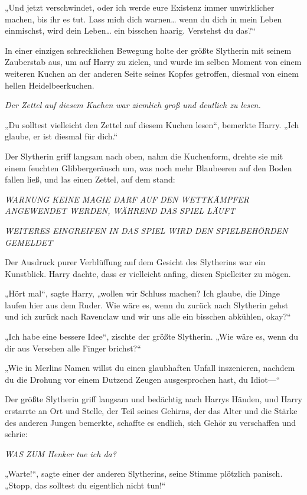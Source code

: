 {„Und jetzt verschwindet, oder ich werde eure Existenz immer unwirklicher machen, bis ihr es tut. Lass mich dich warnen… wenn du dich in mein Leben einmischst, wird dein Leben… ein bisschen haarig. Verstehst du das?“

In einer einzigen schrecklichen Bewegung holte der größte Slytherin mit seinem Zauberstab aus, um auf Harry zu zielen, und wurde im selben Moment von einem weiteren Kuchen an der anderen Seite seines Kopfes getroffen, diesmal von einem hellen Heidelbeerkuchen.

\emph{Der Zettel auf diesem Kuchen war ziemlich groß und deutlich zu lesen.}

„Du solltest vielleicht den Zettel auf diesem Kuchen lesen“, bemerkte Harry. „Ich glaube, er ist diesmal für dich.“

Der Slytherin griff langsam nach oben, nahm die Kuchenform, drehte sie mit einem feuchten Glibbergeräusch um, was noch mehr Blaubeeren auf den Boden fallen ließ, und las einen Zettel, auf dem stand:

\emph{WARNUNG KEINE MAGIE DARF AUF DEN WETTKÄMPFER ANGEWENDET WERDEN, WÄHREND DAS SPIEL LÄUFT}

\emph{WEITERES EINGREIFEN IN DAS SPIEL WIRD DEN SPIELBEHÖRDEN GEMELDET}

Der Ausdruck purer Verblüffung auf dem Gesicht des Slytherins war ein Kunstblick. Harry dachte, dass er vielleicht anfing, diesen Spielleiter zu mögen.

„Hört mal“, sagte Harry, „wollen wir Schluss machen? Ich glaube, die Dinge laufen hier aus dem Ruder. Wie wäre es, wenn du zurück nach Slytherin gehst und ich zurück nach Ravenclaw und wir uns alle ein bisschen abkühlen, okay?“

„Ich habe eine bessere Idee“, zischte der größte Slytherin. „Wie wäre es, wenn du dir aus Versehen alle Finger brichst?“

„Wie in Merlins Namen willst du einen glaubhaften Unfall inszenieren, nachdem du die Drohung vor einem Dutzend Zeugen ausgesprochen hast, du Idiot—“

Der größte Slytherin griff langsam und bedächtig nach Harrys Händen, und Harry erstarrte an Ort und Stelle, der Teil seines Gehirns, der das Alter und die Stärke des anderen Jungen bemerkte, schaffte es endlich, sich Gehör zu verschaffen und schrie:

\emph{WAS ZUM Henker tue ich da?}

„Warte!“, sagte einer der anderen Slytherins, seine Stimme plötzlich panisch. „Stopp, das solltest du eigentlich nicht tun!“

}
